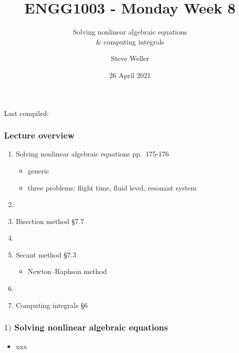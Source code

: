 \documentclass[english,14pt]{beamer}
\title{ENGG1003 - Monday Week 8}
\subtitle{Solving nonlinear algebraic equations \\ \& computing integrals}
\author{Steve Weller}
\institute{University of Newcastle}
\date{26 April 2021}
\newcommand\red[1]{{\color{red} #1}}
\begin{document}
\begin{flushleft}
{\scriptsize Last compiled:~\DTMnow}
\vspace*{-5mm}
\end{flushleft}
\framebreak


\begin{frame}[fragile]

\frametitle{Lecture overview}
\begin{enumerate}
	\item Solving nonlinear algebraic equations \red{pp.~175-176}
	\begin{itemize}
		\item generic
		\item three problems: flight time, fluid level, resonant system
	\end{itemize}
	
	\item[]
	
	\item Bisection method \red{\S7.7}
	
	\item[]
	
	\item Secant method \red{\S7.3}
	\begin{itemize}
		\item Newton--Raphson method
	\end{itemize}
	
	\item[]
	
	\item Computing integrals \red{\S6}

\end{enumerate}

\end{frame}


\begin{frame}[fragile]

\frametitle{$1)$ Solving nonlinear algebraic equations}

\begin{itemize}
	\item xxx
\end{itemize}

\end{frame}

\end{document}
